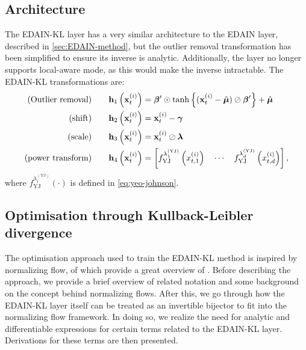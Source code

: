 \documentclass{statsmsc}
\begin{document}
{\subsection{Architecture}%
\label{sub:Architecture}

The \ac{EDAIN-KL} layer has a very similar architecture to the \ac{EDAIN} layer, described in
\cref{sec:EDAIN-method}, but the outlier removal transformation has been simplified to ensure its
inverse is analytic. Additionally, the layer no longer supports local-aware mode, as this
would make the inverse intractable. The \ac{EDAIN-KL} transformations are:
\begin{align}
    \textrm{(Outlier removal)} \qquad& \mathbf{h}_1\left(\mathbf{x}^{(i)}_t\right)=\bm\beta' \odot \tanh\left\{(\mathbf{x}^{(i)}_t - \hat{\bm\mu}) \oslash \bm\beta' \right\}+\hat{\bm\mu} \label{eq:kl1}\\
    \textrm{(shift)} \qquad& \mathbf{h}_2\left(\mathbf{x}^{(i)}_t\right)=\mathbf{x}^{(i)}_t- \bm\gamma \label{eq:kl2}\\
    \textrm{(scale)} \qquad& \mathbf{h}_3\left(\mathbf{x}^{(i)}_t\right)=\mathbf{x}^{(i)}_t \oslash \bm\lambda  \label{eq:kl3}\\
    \textrm{(power transform)} \qquad& \mathbf{h}_4\left(\mathbf{x}^{(i)}_t\right)=\left[
        f^{\lambda_1^ {(\textrm{YJ})} }_{\textrm{YJ}}\left(x^{(i)}_{t,1}\right)
        \quad \cdots
        \quad f^{\lambda_d^ {(\textrm{YJ})}}_{\textrm{YJ}}\left(x^{(i)}_{t,d}\right)
    \right], \label{eq:kl4}
\end{align}
where $f^{\lambda_i^ {(\textrm{YJ})}}_{\textrm{YJ}}(\cdot)$ is defined in \cref{eq:yeo-johnson}.

\subsection{Optimisation through Kullback-Leibler divergence}%
\label{sub:Optimisation through Kullback-Leibler divergence}

The  optimisation approach used to train the \ac{EDAIN-KL} method is inspired by normalizing flow,
of which \citeauthor{normalizing_flows} provide a great overview of \cite{normalizing_flows}.
Before describing the approach, we provide a brief overview of related notation and some
background on the concept behind normalizing flows. After this, we go through how the
\ac{EDAIN-KL} layer itself can be treated as an invertible bijector to fit into the
normalizing flow framework. In doing so, we realize the need for analytic and differentiable
expressions for certain terms related to the \ac{EDAIN-KL} layer. Derivations for these terms are
then presented.

}
\end{document}
